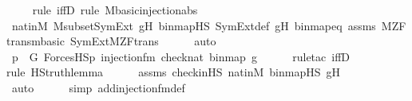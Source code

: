 \begin{isabellebody}
\ \ \ \ \isamarkupfalse%
{\isacharparenleft}{\kern0pt}rule\ iffD{}{\isacharcomma}{\kern0pt}\ rule\ M{\isacharunderscore}{\kern0pt}basic{\isachardot}{\kern0pt}injection{\isacharunderscore}{\kern0pt}abs{\isacharparenright}{\kern0pt}\isanewline
\ \ \ \ \isamarkupfalse%
\ nat{\isacharunderscore}{\kern0pt}in{\isacharunderscore}{\kern0pt}M\ M{\isacharunderscore}{\kern0pt}subset{\isacharunderscore}{\kern0pt}SymExt\ gH\ binmap{\isacharprime}{\kern0pt}{\isacharunderscore}{\kern0pt}HS\ SymExt{\isacharunderscore}{\kern0pt}def\ gH\ binmap{\isacharunderscore}{\kern0pt}eq\ assms\ M{\isacharunderscore}{\kern0pt}ZF{\isacharunderscore}{\kern0pt}trans{\isachardot}{\kern0pt}mbasic\ SymExt{\isacharunderscore}{\kern0pt}M{\isacharunderscore}{\kern0pt}ZF{\isacharunderscore}{\kern0pt}trans\isanewline
\ \ \ \ \isamarkupfalse%
\ auto\isanewline
\ \ \isamarkupfalse%
\ \isamarkupfalse%
\ {\isachardoublequoteopen}{\isasymexists}p\ {\isasymin}\ G{\isachardot}{\kern0pt}\ {\isacharparenleft}{\kern0pt}ForcesHS{\isacharparenleft}{\kern0pt}p{\isacharcomma}{\kern0pt}\ injection{\isacharunderscore}{\kern0pt}fm{\isacharparenleft}{\kern0pt}{}{\isacharcomma}{\kern0pt}{}{\isacharcomma}{\kern0pt}{}{\isacharparenright}{\kern0pt}{\isacharcomma}{\kern0pt}\ {\isacharbrackleft}{\kern0pt}check{\isacharparenleft}{\kern0pt}nat{\isacharparenright}{\kern0pt}{\isacharcomma}{\kern0pt}\ binmap{\isacharprime}{\kern0pt}{\isacharcomma}{\kern0pt}\ g{\isacharprime}{\kern0pt}{\isacharbrackright}{\kern0pt}{\isacharparenright}{\kern0pt}{\isacharparenright}{\kern0pt}{\isachardoublequoteclose}\ \isanewline
\ \ \ \ \isamarkupfalse%
{\isacharparenleft}{\kern0pt}rule{\isacharunderscore}{\kern0pt}tac\ iffD{}{\isacharparenright}{\kern0pt}\isanewline
\ \ \ \ \ \isamarkupfalse%
{\isacharparenleft}{\kern0pt}rule\ HS{\isacharunderscore}{\kern0pt}truth{\isacharunderscore}{\kern0pt}lemma{\isacharparenright}{\kern0pt}\isanewline
\ \ \ \ \isamarkupfalse%
\ assms\ check{\isacharunderscore}{\kern0pt}in{\isacharunderscore}{\kern0pt}HS\ nat{\isacharunderscore}{\kern0pt}in{\isacharunderscore}{\kern0pt}M\ binmap{\isacharprime}{\kern0pt}{\isacharunderscore}{\kern0pt}HS\ g{\isacharprime}{\kern0pt}H\isanewline
\ \ \ \ \ \ \ \ \isamarkupfalse%
\ auto{\isacharbrackleft}{\kern0pt}{}{\isacharbrackright}{\kern0pt}\isanewline
\ \ \ \ \ \isamarkupfalse%
{\isacharparenleft}{\kern0pt}simp\ add{\isacharcolon}{\kern0pt}injection{\isacharunderscore}{\kern0pt}fm{\isacharunderscore}{\kern0pt}def{\isacharparenright}{\kern0pt}\isanewline

\end{isabellebody}
